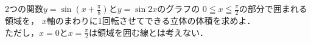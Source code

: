 \documentclass[../../main.tex]{subfiles}
\begin{document}
2つの関数$\displaystyle y=\sin\left(x+\frac{\pi}{8}\right)$と$y=\sin2x$のグラフの
$\displaystyle 0 \leqq x \leqq \frac{\pi}{2}$の部分で囲まれる領域を，
$x$軸のまわりに1回転させてできる立体の体積を求めよ．\\
ただし，$x=0$と$\displaystyle x=\frac{\pi}{2}$は領域を囲む線とは考えない．
\end{document}
